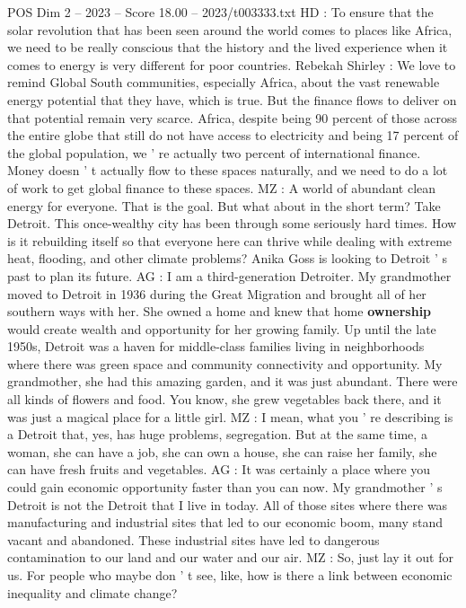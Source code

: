 \begin{textsample}{POS Dim 2 – 2023 – Score 18.00 – 2023/t003333.txt}
HD : To ensure that the solar revolution that has been seen around the world comes to places like Africa, we need to be really conscious that the history and the lived experience when it comes to energy is very different for poor countries.
Rebekah Shirley : We love to remind Global South communities, especially Africa, about the vast renewable energy potential that they have, which is true.
But the finance flows to deliver on that potential remain very scarce.
Africa, despite being 90 percent of those across the entire globe that still do not have access to electricity and being 17 percent of the global population, we ' re actually two percent of international finance.
Money doesn ' t actually flow to these spaces naturally, and we need to do a lot of work to get global finance to these spaces.
MZ : A world of abundant clean energy for everyone.
That is the goal.
But what about in the short term?
Take Detroit.
This once-wealthy city has been through some seriously hard times.
How is it rebuilding itself so that everyone here can thrive while dealing with extreme heat, flooding, and other climate problems?
Anika Goss is looking to Detroit ' s past to plan its future.
AG : I am a third-generation Detroiter.
My grandmother moved to Detroit in 1936 during the Great Migration and brought all of her southern ways with her.
She owned a home and knew that home \textbf{ownership} would create wealth and opportunity for her growing family.
Up until the late 1950s, Detroit was a haven for middle-class families living in neighborhoods where there was green space and community connectivity and opportunity.
My grandmother, she had this amazing garden, and it was just abundant.
There were all kinds of flowers and food.
You know, she grew vegetables back there, and it was just a magical place for a little girl.
MZ : I mean, what you ' re describing is a Detroit that, yes, has huge problems, segregation.
But at the same time, a woman, she can have a job, she can own a house, she can raise her family, she can have fresh fruits and vegetables.
AG : It was certainly a place where you could gain economic opportunity faster than you can now.
My grandmother ' s Detroit is not the Detroit that I live in today.
All of those sites where there was manufacturing and industrial sites that led to our economic boom, many stand vacant and abandoned.
These industrial sites have led to dangerous contamination to our land and our water and our air.
MZ : So, just lay it out for us.
For people who maybe don ' t see, like, how is there a link between economic inequality and climate change?

\end{textsample}
